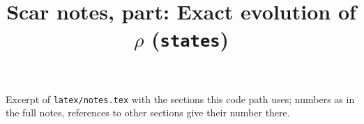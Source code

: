 \documentclass[11pt,a4paper]{article}
\title{Scar notes, part: Exact evolution of $\rho$ (\texttt{states})}
\begin{document}
\maketitle
\noindent Excerpt of \texttt{latex/notes.tex} with the sections this code path uses; numbers as in the full notes, references to other sections give their number there.

\tableofcontents

\end{document}
